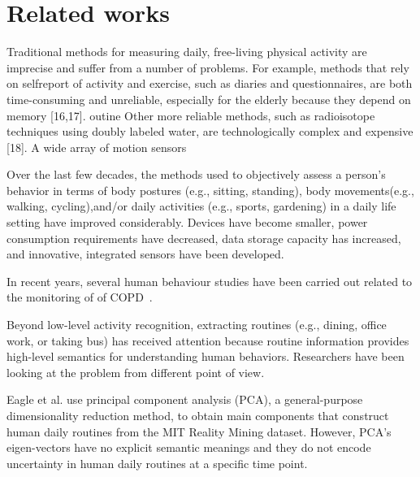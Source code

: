 \section{Related works}
Traditional methods for measuring daily, free-living
physical activity are imprecise and suffer from a number
of problems. For example, methods that rely on selfreport
of activity and exercise, such as diaries and questionnaires,
are both time-consuming and unreliable, especially
for the elderly because they depend on memory
[16,17]. outine
Other more reliable methods, such as radioisotope
techniques using doubly labeled water, are technologically
complex and expensive [18].
A wide array of motion sensors 




Over the last few decades, the methods used to objectively assess a person's behavior in terms of body postures (e.g., sitting, standing), body movements(e.g., walking, cycling),and/or daily activities (e.g., sports, gardening) in a daily life setting have improved considerably. Devices have become smaller, power consumption requirements have decreased, data storage capacity has increased, and innovative, integrated sensors have been developed. 

In recent years, several human behaviour studies have been carried out related to the monitoring of of COPD~\cite{Waschki_2012, Patel_2007}. 

Beyond low-level activity recognition, extracting routines (e.g., dining, office work, or taking bus)
has received attention because routine information provides high-level semantics for understanding human behaviors. 
Researchers have been looking at the problem from different point of view.




Eagle et al. \cite{Eagle_2009} use principal component analysis (PCA), a general-purpose dimensionality reduction method, 
to obtain main components that construct human daily routines from the MIT Reality Mining dataset. 
However, PCA’s eigen-vectors have no explicit semantic meanings and they do not encode uncertainty 
in human daily routines at a specific time point. 


